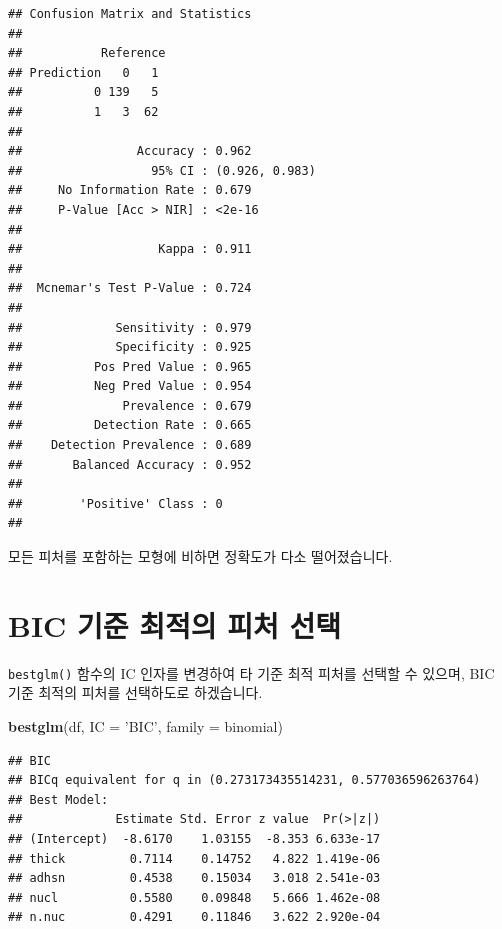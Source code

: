 \documentclass[12pt,]{book}
\newenvironment{Shaded}{\begin{snugshade}}{\end{snugshade}}
\newcommand{\DataTypeTok}[1]{\textcolor[rgb]{0.13,0.29,0.53}{#1}}
\newcommand{\KeywordTok}[1]{\textcolor[rgb]{0.13,0.29,0.53}{\textbf{#1}}}
\newcommand{\NormalTok}[1]{#1}
\newcommand{\StringTok}[1]{\textcolor[rgb]{0.31,0.60,0.02}{#1}}
\begin{document}
\begin{verbatim}
## Confusion Matrix and Statistics
## 
##           Reference
## Prediction   0   1
##          0 139   5
##          1   3  62
##                                         
##                Accuracy : 0.962         
##                  95% CI : (0.926, 0.983)
##     No Information Rate : 0.679         
##     P-Value [Acc > NIR] : <2e-16        
##                                         
##                   Kappa : 0.911         
##                                         
##  Mcnemar's Test P-Value : 0.724         
##                                         
##             Sensitivity : 0.979         
##             Specificity : 0.925         
##          Pos Pred Value : 0.965         
##          Neg Pred Value : 0.954         
##              Prevalence : 0.679         
##          Detection Rate : 0.665         
##    Detection Prevalence : 0.689         
##       Balanced Accuracy : 0.952         
##                                         
##        'Positive' Class : 0             
## 
\end{verbatim}

모든 피처를 포함하는 모형에 비하면 정확도가 다소 떨어졌습니다.

\hypertarget{bic-uxae30uxc900-uxcd5cuxc801uxc758-uxd53cuxcc98-uxc120uxd0dd}{%
\section{BIC 기준 최적의 피처 선택}\label{bic-uxae30uxc900-uxcd5cuxc801uxc758-uxd53cuxcc98-uxc120uxd0dd}}

\texttt{bestglm()} 함수의 IC 인자를 변경하여 타 기준 최적 피처를 선택할 수 있으며, BIC 기준 최적의 피처를 선택하도로 하겠습니다.

\begin{Shaded}
\begin{Highlighting}[]
\KeywordTok{bestglm}\NormalTok{(df, }\DataTypeTok{IC =} \StringTok{'BIC'}\NormalTok{, }\DataTypeTok{family =}\NormalTok{ binomial)}
\end{Highlighting}
\end{Shaded}

\begin{verbatim}
## BIC
## BICq equivalent for q in (0.273173435514231, 0.577036596263764)
## Best Model:
##             Estimate Std. Error z value  Pr(>|z|)
## (Intercept)  -8.6170    1.03155  -8.353 6.633e-17
## thick         0.7114    0.14752   4.822 1.419e-06
## adhsn         0.4538    0.15034   3.018 2.541e-03
## nucl          0.5580    0.09848   5.666 1.462e-08
## n.nuc         0.4291    0.11846   3.622 2.920e-04
\end{verbatim}
\end{document}
